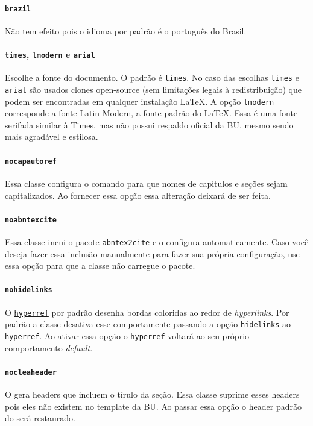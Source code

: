 \documentclass[embeddedlogo]{ufsc-thesis-rn46-2019}
\begin{document}
\paragraph*{\texttt{brazil}} Não tem efeito pois o idioma por padrão é o português do Brasil.

\paragraph*{\texttt{times}, \texttt{lmodern} e \texttt{arial}} Escolhe a fonte do documento. O padrão é \texttt{times}. No caso das escolhas \texttt{times} e \texttt{arial} são usados clones open-source (sem limitações legais à redistribuição) que podem ser encontradas em qualquer instalação \LaTeX. A opção \texttt{lmodern} corresponde a fonte Latin Modern, a fonte padrão do \LaTeX. Essa é uma fonte serifada similar à Times, mas não possui respaldo oficial da BU, mesmo sendo mais agradável e estilosa.

\paragraph*{\texttt{nocapautoref}} Essa classe configura o comando \mt{\autoref} para que nomes de capitulos e seções sejam capitalizados. Ao fornecer essa opção essa alteração deixará de ser feita.

\paragraph*{\texttt{noabntexcite}} Essa classe incui o pacote \texttt{abntex2cite} e o configura automaticamente. Caso você deseja fazer essa inclusão manualmente para fazer sua própria configuração, use essa opção para que a classe não carregue o pacote.

\paragraph*{\texttt{nohidelinks}} O \href{https://ctan.org/pkg/hyperref}{\texttt{hyperref}} por padrão desenha bordas coloridas ao redor de \textit{hyperlinks}. Por padrão a classe desativa esse comportamente passando a opção \texttt{hidelinks} ao \texttt{hyperref}. Ao ativar essa opção o \texttt{hyperref} voltará ao seu próprio comportamento \textit{default}.

\paragraph*{\texttt{nocleaheader}} O \abnTeX gera headers que incluem o tírulo da seção. Essa classe suprime esses headers pois eles não existem no template da BU. Ao passar essa opção o header padrão do \abnTeX será restaurado.
\end{document}
